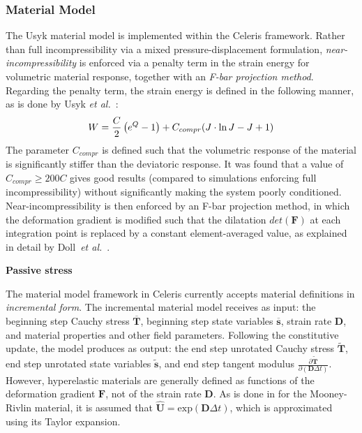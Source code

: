 \subsubsection{Material Model}
The Usyk material model is implemented within the Celeris framework. Rather than full incompressibility via a mixed pressure-displacement formulation, \textit{near-incompressibility} is enforced via a penalty term in the strain energy for volumetric material response, together with an \textit{F-bar projection method}. Regarding the penalty term, the strain energy is defined in the following manner, as is done by Usyk \textit{et al.}~\cite{usyk_2002}:
\begin{equation}
W = \frac{C}{2}\left(e^Q -1\right) + C_{compr} (J \cdot \ln J - J + 1) \\
\end{equation}
The parameter $C_{compr}$ is defined such that the volumetric response of the material is significantly stiffer than the deviatoric response. It was found that a value of $C_{compr} \geq 200  C$ gives good results (compared to simulations enforcing full incompressibility) without significantly making the system poorly conditioned. Near-incompressibility is then enforced by an F-bar projection method, in which the deformation gradient is modified such that the dilatation $det(\bm{F})$ at each integration point is replaced by a constant element-averaged value, as explained in detail by Doll~\textit{et al.}~\cite{doll_2000}.

\textbf{Passive stress}

The material model framework in Celeris currently accepts material definitions in \textit{incremental form}. The incremental material model receives as input: the beginning step Cauchy stress $\overline{\bm{T}}$, beginning step state variables $\overline{\bm{s}}$, strain rate $\bm{D}$, and material properties and other field parameters. Following the constitutive update, the model produces as output: the end step unrotated Cauchy stress $\tilde{\bm{T}}$, end step unrotated state variables $\tilde{\bm{s}}$, and end step tangent modulus $\frac{\partial \tilde{\bm{T}}}{\partial (\bm{D}\Delta{t})}$. However, hyperelastic materials are generally defined as functions of the deformation gradient $\bm{F}$, not of the strain rate $\bm{D}$. As is done in  for the Mooney-Rivlin material, it is assumed that $\hat{\bm{U}} = \text{exp}(\bm{D}\Delta{t})$, which is approximated using its Taylor expansion.

